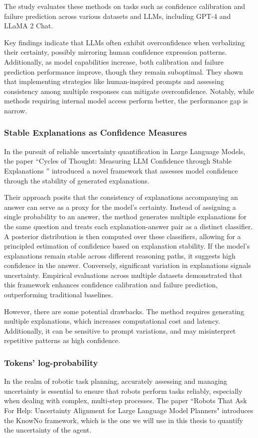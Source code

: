 The study evaluates these methods on tasks such as confidence calibration and failure
prediction across various datasets and LLMs, including GPT-4 and LLaMA 2 Chat.

Key findings indicate that LLMs often exhibit overconfidence when verbalizing
their certainty, possibly mirroring human confidence expression patterns.
Additionally, as model capabilities increase, both calibration and failure
prediction performance improve, though they remain suboptimal. They shown that
implementing strategies like human-inspired prompts and assessing consistency
among multiple responses can mitigate overconfidence. Notably, while methods
requiring internal model access perform better, the performance gap is narrow.

\subsubsection{Stable Explanations as Confidence Measures}
In the pursuit of reliable uncertainty quantification in Large Language Models,
the paper ``Cycles of Thought: Measuring LLM Confidence through Stable Explanations
'' \cite{becker2024cyclesthoughtmeasuringllm} introduced a novel framework that
assesses model confidence through the stability of generated explanations.

Their approach posits that the consistency of explanations accompanying an
answer can serve as a proxy for the model's certainty. Instead of assigning a single
probability to an answer, the method generates multiple explanations for the
same question and treats each explanation-answer pair as a distinct classifier. A
posterior distribution is then computed over these classifiers, allowing for a
principled estimation of confidence based on explanation stability. If the model's
explanations remain stable across different reasoning paths, it suggests high
confidence in the answer. Conversely, significant variation in explanations
signals uncertainty. Empirical evaluations across multiple datasets demonstrated
that this framework enhances confidence calibration and failure prediction,
outperforming traditional baselines.

However, there are some potential drawbacks. The method requires generating
multiple explanations, which increases computational cost and latency.
Additionally, it can be sensitive to prompt variations, and may misinterpret
repetitive patterns as high confidence.

\subsubsection{Tokens' log-probability}
In the realm of robotic task planning, accurately assessing and managing uncertainty
is essential to ensure that robots perform tasks reliably, especially when
dealing with complex, multi-step processes. The paper ``Robots That Ask For Help:
Uncertainty Alignment for Large Language Model Planners"
\cite{ren2023robotsaskhelpuncertainty} introduces the KnowNo framework, which is
the one we will use in this thesis to quantify the uncertainty of the agent.

